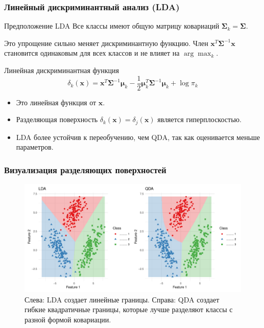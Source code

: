 \documentclass[notheorems, handout]{beamer}
\newcommand{\vect}[1]{\mathbf{#1}}
\newcommand{\matr}[1]{\boldsymbol{#1}}
\begin{document}
\begin{frame}
  \frametitle{Линейный дискриминантный анализ (LDA)}
  \begin{block}{Предположение LDA}
    Все классы имеют общую матрицу ковариаций $\matr{\Sigma}_k = \matr{\Sigma}$.
  \end{block}

  Это упрощение сильно меняет дискриминантную функцию. Член
  $\vect{x}^T\matr{\Sigma}^{-1}\vect{x}$ становится одинаковым для
  всех классов и не влияет на $\arg\max_k$.

  \begin{block}{Линейная дискриминантная функция}
    $$ \delta_k(\vect{x}) = \vect{x}^T\matr{\Sigma}^{-1}\matr{\mu}_k
    - \frac{1}{2}\matr{\mu}_k^T\matr{\Sigma}^{-1}\matr{\mu}_k + \log\pi_k $$
  \end{block}
  \begin{itemize}
    \item Это линейная функция от $\vect{x}$.
    \item Разделяющая поверхность $\delta_k(\vect{x}) =
      \delta_j(\vect{x})$ является гиперплоскостью.
    \item LDA более устойчив к переобучению, чем QDA, так как
      оценивается меньше параметров.
  \end{itemize}
\end{frame}
\begin{frame}
  \frametitle{Визуализация разделяющих поверхностей}
  \begin{figure}
    \includegraphics[width=\textwidth]{img/lda_vs_qda.pdf}
    \caption{Слева: LDA создает линейные границы. Справа: QDA создает
      гибкие квадратичные границы, которые лучше разделяют классы с
    разной формой ковариации.}
  \end{figure}
\end{frame}
\end{document}

